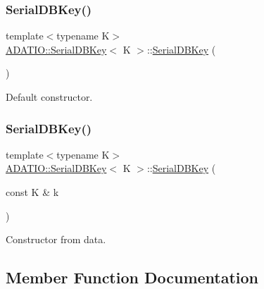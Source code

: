 \subsubsection{\texorpdfstring{SerialDBKey()}{SerialDBKey()}\hspace{0.1cm}{\footnotesize\ttfamily [3/4]}}
{\footnotesize\ttfamily template$<$typename K$>$ \\
\mbox{\hyperlink{classADATIO_1_1SerialDBKey}{A\+D\+A\+T\+I\+O\+::\+Serial\+D\+B\+Key}}$<$ K $>$\+::\mbox{\hyperlink{classADATIO_1_1SerialDBKey}{Serial\+D\+B\+Key}} (\begin{DoxyParamCaption}{ }\end{DoxyParamCaption})\hspace{0.3cm}{\ttfamily [inline]}}



Default constructor. 

\mbox{\label{classADATIO_1_1SerialDBKey_ad035f1ac5d8565aec4e5a7197333123f}} 
\subsubsection{\texorpdfstring{SerialDBKey()}{SerialDBKey()}\hspace{0.1cm}{\footnotesize\ttfamily [4/4]}}
{\footnotesize\ttfamily template$<$typename K$>$ \\
\mbox{\hyperlink{classADATIO_1_1SerialDBKey}{A\+D\+A\+T\+I\+O\+::\+Serial\+D\+B\+Key}}$<$ K $>$\+::\mbox{\hyperlink{classADATIO_1_1SerialDBKey}{Serial\+D\+B\+Key}} (\begin{DoxyParamCaption}\item[{const K \&}]{k }\end{DoxyParamCaption})\hspace{0.3cm}{\ttfamily [inline]}}



Constructor from data. 



\subsection{Member Function Documentation}
\mbox{\label{classADATIO_1_1SerialDBKey_a5f73c31df1c824c61790ab7645fc030f}} 
